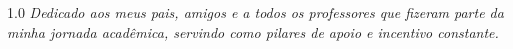 
\null
\vfill %

\begin{flushright}
  \begin{minipage}{8cm}
    \begin{spacing}{1.0}
      \itshape %
      Dedicado aos meus pais, amigos e a todos os professores que 
      fizeram parte da minha jornada acadêmica, servindo como pilares 
      de apoio e incentivo constante.
    \end{spacing}
  \end{minipage}
\end{flushright}
